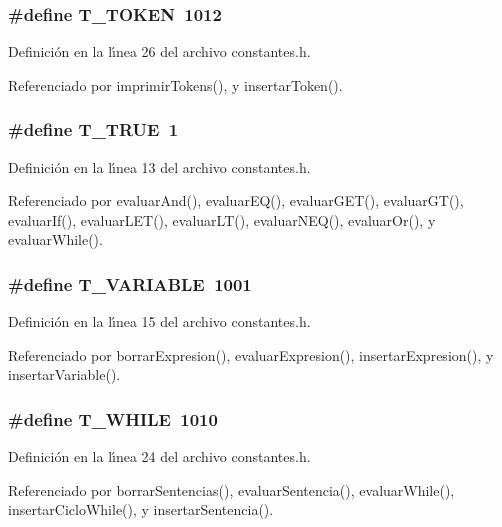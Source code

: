 \subsubsection{\setlength{\rightskip}{0pt plus 5cm}\#define T\_\-TOKEN~1012}\label{constantes_8h_a15}




Definici\'{o}n en la l\'{\i}nea 26 del archivo constantes.h.

Referenciado por imprimir\-Tokens(), y insertar\-Token().
\subsubsection{\setlength{\rightskip}{0pt plus 5cm}\#define T\_\-TRUE~1}\label{constantes_8h_a2}




Definici\'{o}n en la l\'{\i}nea 13 del archivo constantes.h.

Referenciado por evaluar\-And(), evaluar\-EQ(), evaluar\-GET(), evaluar\-GT(), evaluar\-If(), evaluar\-LET(), evaluar\-LT(), evaluar\-NEQ(), evaluar\-Or(), y evaluar\-While().
\subsubsection{\setlength{\rightskip}{0pt plus 5cm}\#define T\_\-VARIABLE~1001}\label{constantes_8h_a4}




Definici\'{o}n en la l\'{\i}nea 15 del archivo constantes.h.

Referenciado por borrar\-Expresion(), evaluar\-Expresion(), insertar\-Expresion(), y insertar\-Variable().
\subsubsection{\setlength{\rightskip}{0pt plus 5cm}\#define T\_\-WHILE~1010}\label{constantes_8h_a13}




Definici\'{o}n en la l\'{\i}nea 24 del archivo constantes.h.

Referenciado por borrar\-Sentencias(), evaluar\-Sentencia(), evaluar\-While(), insertar\-Ciclo\-While(), y insertar\-Sentencia().